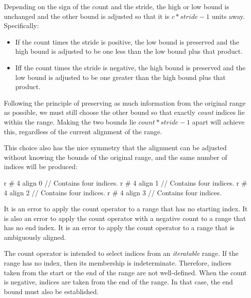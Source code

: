 Depending on the sign of the count and the stride, the high or low bound is
unchanged and the other bound is adjusted so that it is $c * stride - 1$ units
away.  Specifically:
\begin{itemize}
\item If the count times the stride is positive, the low bound is preserved
and the high bound is adjusted to be one less than the low bound plus that
product.
\item Iff the count times the stride is negative, the high bound is preserved
and the low bound is adjusted to be one greater than the high bound plus that
product.
\end{itemize}

\begin{rationale}
Following the principle of preserving as much information from the original
range as possible, we must still choose the other bound so that
exactly \emph{count} indices lie within the range.  Making the two bounds lie
$count * stride - 1$ apart will achieve this, regardless of the current
alignment of the range.

This choice also has the nice symmetry that the alignment can be adjusted
without knowing the bounds of the original range, and the same number of indices
will be produced:
\begin{chapel}
r # 4 align 0   // Contains four indices.
r # 4 align 1   // Contains four indices.
r # 4 align 2   // Contains four indices.
r # 4 align 3   // Contains four indices.
\end{chapel}
\end{rationale}

It is an error to apply the count operator to a range that
has no starting index.  It is also an error to apply the count operator
with a negative count to a range that has no end index.
It is an error to apply the count operator to a range that is ambiguously aligned.

\begin{rationale}
The count operator is intended to select indices from an \emph{iteratable}
range.  If the range has no  index, then its membership is
indeterminate.  Therefore, indices taken from the start or the end of the range
are not well-defined.  When the count is negative, indices are taken from the
end of the range.  In that case, the end bound must also be established.
\end{rationale}

